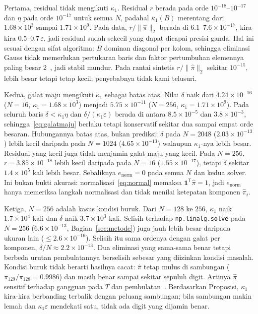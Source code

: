 \documentclass[12pt,a4paper]{article}
\newcommand{\T}{\mathsf{T}}
\numberwithin{equation}{section}
\begin{document}
Pertama, residual tidak mengikuti $\kappa_1$. Residual $r$ berada pada orde $10^{-18}$--$10^{-17}$ dan $\eta$ pada orde
$10^{-17}$ untuk semua $N$, padahal $\kappa_1(B)$ merentang dari $1.68\times10^{3}$ sampai $1.71\times10^{9}$. Pada
data, $r/\lVert\hat\pi\rVert_2$ berada di $6.1$--$7.6\times10^{-17}$, kira-kira $0.5$--$0.7\,\varepsilon$, jadi residual
sudah sekecil yang dapat dicapai presisi ganda. Hal ini sesuai dengan sifat algoritma: $B$ dominan diagonal per kolom,
sehingga eliminasi Gauss tidak memerlukan pertukaran baris dan faktor pertumbuhan elemennya paling besar 2~\cite{higham},
jadi stabil mundur. Pada rantai sintetis $r/\lVert\hat\pi\rVert_2$ sekitar $10^{-15}$, lebih besar tetapi tetap kecil;
penyebabnya tidak kami telusuri.

Kedua, galat maju mengikuti $\kappa_1$ sebagai batas atas. Nilai $\delta$ naik dari $4.24\times10^{-16}$ ($N=16$,
$\kappa_1=1.68\times10^{3}$) menjadi $5.75\times10^{-11}$ ($N=256$, $\kappa_1=1.71\times10^{9}$). Pada seluruh baris
$\delta<\kappa_1\eta$ dan $\delta/(\kappa_1\varepsilon)$ berada di antara $8.5\times10^{-5}$ dan $3.8\times10^{-3}$,
sehingga~\eqref{eq:galatmaju} berlaku tetapi konservatif sekitar dua sampai empat orde besaran. Hubungannya batas atas,
bukan prediksi: $\delta$ pada $N=2048$ ($2.03\times10^{-13}$) lebih kecil daripada pada $N=1024$ ($4.65\times10^{-13}$)
walaupun $\kappa_1$-nya lebih besar. Residual yang kecil juga tidak menjamin galat maju yang kecil. Pada $N=256$,
$r=3.85\times10^{-18}$ lebih kecil daripada pada $N=16$ ($1.55\times10^{-17}$), tetapi $\delta$ sekitar
$1.4\times10^{5}$ kali lebih besar. Sebaliknya $e_{\mathrm{norm}}=0$ pada semua $N$ dan kedua solver. Ini bukan bukti
akurasi: normalisasi~\eqref{eq:normal} memaksa $\mathbf1^\T\hat\pi=1$, jadi $e_{\mathrm{norm}}$ hanya memeriksa langkah
normalisasi dan tidak menilai ketepatan komponen $\hat\pi_i$.

Ketiga, $N=256$ adalah kasus kondisi buruk. Dari $N=128$ ke $256$, $\kappa_1$ naik $1.7\times10^{4}$ kali dan $\delta$ naik
$3.7\times10^{3}$ kali. Selisih terhadap \texttt{np.linalg.solve} pada $N=256$ ($6.6\times10^{-13}$, Bagian~\ref{sec:metode})
juga jauh lebih besar daripada ukuran lain ($\le2.6\times10^{-16}$). Selisih itu sama ordenya dengan galat per komponen,
$\delta/N\approx2.2\times10^{-13}$. Dua eliminasi yang sama-sama benar tetapi berbeda urutan pembulatannya berselisih
sebesar yang diizinkan kondisi masalah. Kondisi buruk tidak berarti hasilnya cacat: $\hat\pi$ tetap mulus di sambungan
($\pi_{129}/\pi_{128}=0.9986$) dan masih benar sampai sekitar sepuluh digit. Artinya $\hat\pi$ sensitif terhadap gangguan
pada $T$ dan pembulatan~\cite{chomeyer}. Berdasarkan Proposisi, $\kappa_1$ kira-kira berbanding terbalik dengan peluang
sambungan; bila sambungan makin lemah dan $\kappa_1\varepsilon$ mendekati satu, tidak ada digit yang dijamin benar.
\end{document}
